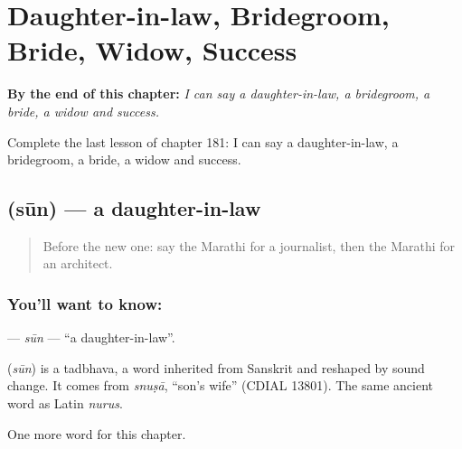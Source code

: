 
\chapter{Daughter-in-law, Bridegroom, Bride, Widow, Success}
\label{ch:mr-daughter-in-law-bridegroom-bride-widow-success}

\begin{chapteropening}
\textbf{By the end of this chapter:} \emph{I can say a daughter-in-law, a bridegroom, a bride, a widow and success.}

Complete the last lesson of chapter 181: I can say a daughter-in-law, a bridegroom, a bride, a widow and success.
\end{chapteropening}

\section[\texorpdfstring{\mr{सून} (sūn)}{सून (sūn)}]{ (sūn) — a daughter-in-law}

\label{lesson:MR-C181-sun}



\begin{quote}
Before the new one: say the Marathi for a journalist, then the Marathi for an architect.
\end{quote}

\subsection*{You'll want to know: }
\textbf{} — \emph{sūn} — \textquotedblleft{}a daughter-in-law\textquotedblright{}.

\begin{cousinweb}
\textbf{} (\emph{sūn}) is a tadbhava, a word inherited from Sanskrit and reshaped by sound change. It comes from \emph{snuṣā}, \textquotedblleft{}son's wife\textquotedblright{} (CDIAL 13801). The same ancient word as Latin \emph{nurus}.
\end{cousinweb}

\begin{grammarlens}[title={What you've built}]
One more word for this chapter.
\end{grammarlens}

